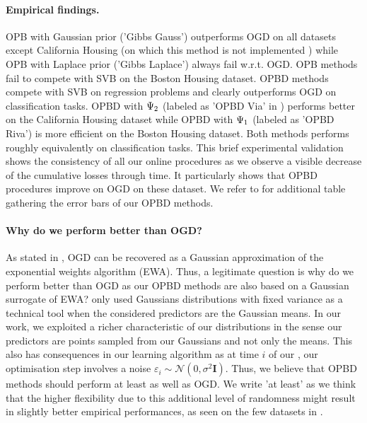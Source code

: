  \paragraph{Empirical findings.} OPB with Gaussian prior ('Gibbs Gauss') outperforms OGD on all datasets except California Housing (on which this method is not implemented ) while OPB with Laplace prior ('Gibbs Laplace') always fail w.r.t. OGD. OPB methods fail to compete with SVB on the Boston Housing dataset. OPBD methods compete with SVB on regression problems and clearly outperforms OGD on classification tasks. OPBD with $\Psi_{\normalfont2}$ (labeled as 'OPBD Via' in ) performs better on the California Housing dataset while OPBD with $\Psi_{\normalfont1}$ (labeled as 'OPBD Riva') is more efficient on the Boston Housing dataset. Both methods performs roughly equivalently on classification tasks.  This brief experimental validation shows the consistency of all our online procedures as we observe a visible decrease of the cumulative losses through time. It particularly shows that OPBD procedures improve on OGD on these dataset. We refer to  for additional table gathering the error bars of our OPBD methods.

\paragraph{Why do we perform better than OGD?} As stated in , OGD can be recovered as a Gaussian approximation of the exponential weights algorithm (EWA). Thus, a legitimate question is why do we perform better than OGD as our OPBD methods are also based on a Gaussian surrogate of EWA?  \cite{hoeven2018many} only used Gaussians distributions with fixed variance as a technical tool when the considered predictors are the Gaussian means. In our work, we exploited a richer characteristic of our distributions in the sense our predictors are points sampled from our Gaussians and not only the means. This also has consequences in our learning algorithm as at time $i$ of our , our optimisation step involves a noise $\varepsilon_i\sim \mathcal{N}(0,\sigma^2\mathbf{I})$. Thus, we believe that OPBD methods should perform at least as well as OGD.
We write 'at least' as we think that the higher flexibility due to this additional level of randomness might result in slightly better empirical performances, as seen on the few datasets in .





